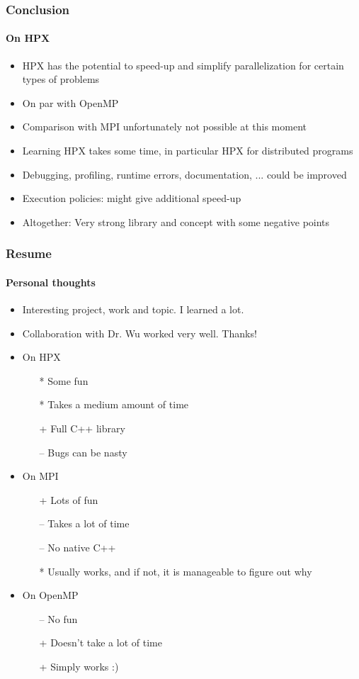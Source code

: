 \begin{frame}
\frametitle{Conclusion}
\framesubtitle{On HPX}
\begin{itemize}
 \item HPX has the potential to speed-up and simplify parallelization for certain types of problems
 \item On par with OpenMP
 \item Comparison with MPI unfortunately not possible at this moment
 \item Learning HPX takes some time, in particular HPX for distributed programs
 \item Debugging, profiling, runtime errors, documentation, ...  could be improved
 \item Execution policies: might give additional speed-up
 \item Altogether: Very strong library and concept with some negative points
\end{itemize}
\end{frame}

\begin{frame}
\frametitle{Resume}
\framesubtitle{Personal thoughts}
\begin{itemize}
 \item Interesting project, work and topic. I learned a lot.
 \item Collaboration with Dr. Wu worked very well. Thanks!
 \item On HPX
       \begin{itemize}
        \item[*] Some fun
        \item[*] Takes a medium amount of time
        \item[+] Full C++ library
        \item[--] Bugs can be nasty
       \end{itemize}
 \item On MPI
       \begin{itemize}
        \item[+] Lots of fun
        \item[--] Takes a lot of time
        \item[--] No native C++
        \item[*] Usually works, and if not, it is manageable to figure out why
       \end{itemize}
 \item On OpenMP
       \begin{itemize}
        \item[--] No fun
        \item[+] Doesn't take a lot of time
        \item[+] Simply works :)
       \end{itemize}
\end{itemize}
\end{frame}



